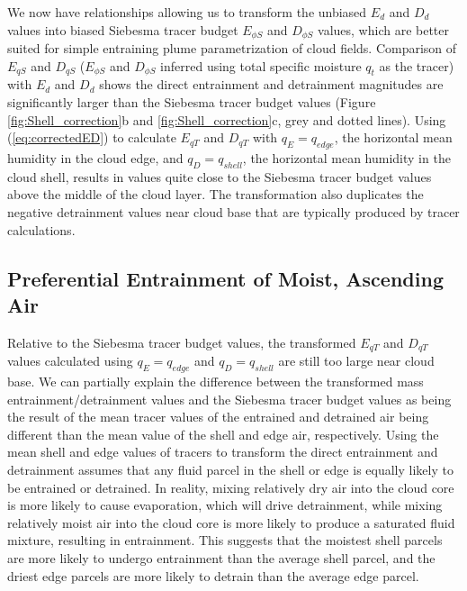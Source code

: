 \documentclass[12pt]{article}
\begin{document}
We now have relationships allowing us to transform the unbiased
$E_{d}$ and $D_{d}$ values into biased Siebesma tracer budget
$E_{\phi S}$ and $D_{\phi S}$ values, which are better suited for
simple entraining plume parametrization of cloud fields.
Comparison of $E_{q S}$ and $D_{q S}$ ($E_{\phi S}$ and $D_{\phi S}$ inferred
using total specific moisture $q_t$ as the tracer) with $E_d$ and $D_d$
shows the direct entrainment and detrainment magnitudes are significantly larger 
than the Siebesma tracer budget values (Figure \ref{fig:Shell_correction}b 
and \ref{fig:Shell_correction}c, grey and dotted lines).  
Using (\ref{eq:correctedED}) to calculate $E_{q T}$ and $D_{q T}$ with
$q_E = q_{edge}$, the horizontal mean humidity in the cloud edge, and 
$q_D = q_{shell}$, the horizontal mean humidity in the cloud shell, results in 
values quite close to the Siebesma tracer budget values above the middle of the 
cloud layer. The transformation also duplicates the negative detrainment values 
near cloud base that are typically produced by tracer calculations.


\subsection{Preferential Entrainment of Moist, Ascending Air}

Relative to the Siebesma tracer budget values, the transformed $E_{q T}$ and 
$D_{q T}$ values calculated using $q_E = q_{edge}$ and $q_D = q_{shell}$ are 
still too large near cloud base. We can partially explain the difference 
between the transformed mass entrainment/detrainment values and the Siebesma 
tracer budget values as being the result of the mean tracer values 
of the entrained and detrained air being different than the mean value of the 
shell and edge air, respectively.  Using the mean shell and edge values of 
tracers to transform the direct entrainment and detrainment assumes that any 
fluid parcel in the shell or edge is equally likely to be entrained or 
detrained.  In reality, mixing relatively dry air into the cloud core is more 
likely to cause evaporation, which will drive detrainment, while mixing 
relatively moist air into the cloud core is more likely to produce a saturated 
fluid mixture, resulting in entrainment.  This suggests that the moistest 
shell parcels are more likely to undergo entrainment than the average shell 
parcel, and the driest edge parcels are more likely to detrain than the 
average edge parcel.
\end{document}
